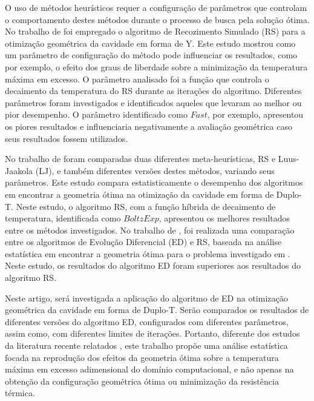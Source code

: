 \documentclass[12pt,A4,A4pt]{article}
\begin{document}
O uso de métodos heurísticos requer a configuração de parâmetros que controlam o comportamento destes métodos durante o processo de busca pela solução ótima. No trabalho de \cite{Gonzales2015energy} foi empregado o algoritmo de Recozimento Simulado (RS) para a otimização geométrica da cavidade em forma de Y. Este estudo mostrou como um parâmetro de configuração do método pode influenciar os resultados, como por exemplo, o efeito dos graus de liberdade sobre a minimização da temperatura máxima em excesso. O parâmetro analisado foi a função que controla o decaimento da temperatura do RS durante as iterações do algoritmo. Diferentes parâmetros foram investigados e identificados aqueles que levaram ao melhor ou pior desempenho. O parâmetro identificado como $Fast$, por exemplo, apresentou os piores resultados e influenciaria negativamente a avaliação geométrica caso seus resultados fossem utilizados. 

No trabalho de \cite{Gonzales2017} foram comparadas duas diferentes meta-heurísticas, RS e Luus-Jaakola (LJ), e também diferentes versões destes métodos, variando seus parâmetros. Este estudo compara estatisticamente o desempenho dos algoritmos em encontrar a geometria ótima na otimização da cavidade em forma de Duplo-T. Neste estudo, o algoritmo RS, com a função híbrida de decaimento de temperatura, identificada como $BoltzExp$, apresentou os melhores resultados entre os métodos investigados. No trabalho de \cite{Gonzales2018}, foi realizada uma comparação entre os algoritmos de Evolução Diferencial (ED) e RS, baseada na análise estatística em encontrar a geometria ótima para o problema investigado em \cite{Gonzales2017}. Neste estudo, os resultados do algoritmo ED foram superiores aos resultados do algoritmo RS.

Neste artigo, será investigada a aplicação do algoritmo de ED na otimização geométrica da cavidade em forma de Duplo-T. Serão comparados os resultados de diferentes versões do algoritmo ED, configurados com diferentes parâmetros, assim como, com diferentes limites de iterações. Portanto, diferente dos estudos da literatura recente relatados \citep{Gonzales2017, Gonzales2018}, este trabalho propõe uma análise estatística focada na reprodução dos efeitos da geometria ótima sobre a temperatura máxima em excesso adimensional do domínio computacional, e não apenas na obtenção da configuração geométrica ótima ou minimização da resistência térmica.
\end{document}
